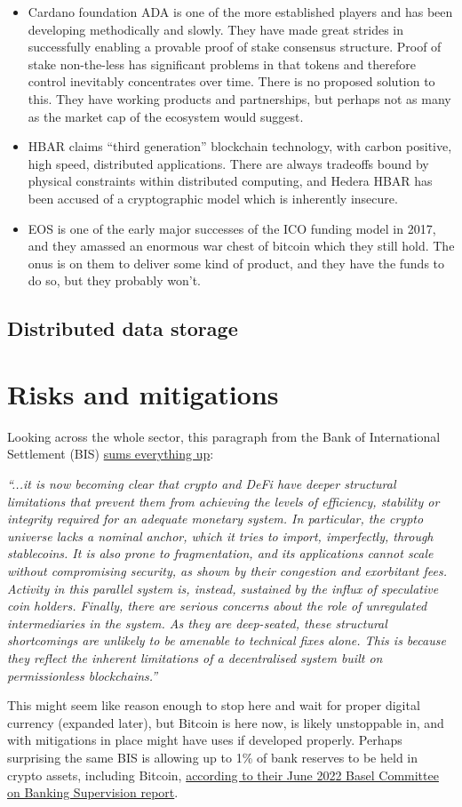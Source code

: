 \begin{itemize}
\item Cardano foundation ADA is one of the more established players and has been developing methodically and slowly. They have made great strides in successfully enabling a provable proof of stake consensus structure. Proof of stake non-the-less has significant problems in that tokens and therefore control inevitably concentrates over time. There is no proposed solution to this. They have working products and partnerships, but perhaps not as many as the market cap of the ecosystem would suggest. 
\item HBAR claims ``third generation'' blockchain technology, with carbon positive, high speed, distributed applications. There are always tradeoffs bound by physical constraints within distributed computing, and Hedera HBAR has been accused of a cryptographic model which is inherently insecure.
\item EOS is one of the early major successes of the ICO funding model in 2017, and they amassed an enormous war chest of bitcoin which they still hold. The onus is on them to deliver some kind of product, and they have the funds to do so, but they probably won't.
\end{itemize}
\subsection{Distributed data storage}
\lipsum
\section{Risks and mitigations}
Looking across the whole sector, this paragraph from the Bank of International Settlement (BIS) \href{https://www.bis.org/publ/arpdf/ar2022e3.htm}{sums everything up}: \par
\textit{``...it is now becoming clear that crypto and DeFi have deeper structural limitations that prevent them from achieving the levels of efficiency, stability or integrity required for an adequate monetary system. In particular, the crypto universe lacks a nominal anchor, which it tries to import, imperfectly, through stablecoins. It is also prone to fragmentation, and its applications cannot scale without compromising security, as shown by their congestion and exorbitant fees. Activity in this parallel system is, instead, sustained by the influx of speculative coin holders. Finally, there are serious concerns about the role of unregulated intermediaries in the system. As they are deep-seated, these structural shortcomings are unlikely to be amenable to technical fixes alone. This is because they reflect the inherent limitations of a decentralised system built on permissionless blockchains.''}\par
This might seem like reason enough to  stop here and wait for proper digital currency (expanded later), but Bitcoin is here now, is likely unstoppable in, and with mitigations in place might have uses if developed properly. Perhaps surprising the same BIS is allowing up to 1\% of bank reserves to be held in crypto assets, including Bitcoin, \href{https://www.bis.org/bcbs/publ/d533.pdf}{according to their June 2022 Basel Committee on Banking Supervision report}.
